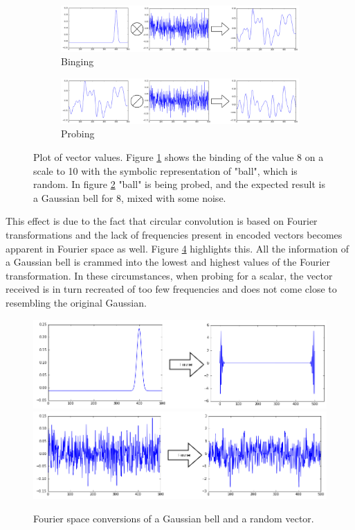 \documentclass[conference]{IEEEtran}
\begin{document}
\begin{figure}
\begin{subfigure}{1\columnwidth}
\includegraphics[width=\columnwidth]{img/scalar-pre-perm.png}
\caption{Binging}
\label{no-perm-a}
\end{subfigure}
\begin{subfigure}{1\columnwidth}
\includegraphics[width=\columnwidth]{img/scalar-pre-perm-probe.png}
\caption{Probing}
\label{no-perm-b}
\end{subfigure}
\caption{Plot of vector values. Figure \ref{no-perm-a} shows the binding of the value 8 on a scale to 10 with the symbolic representation of "ball", which is random. In figure \ref{no-perm-b} "ball" is being probed, and the expected result is a Gaussian bell for 8, mixed with some noise.}
\label{no-perm}
\end{figure}

This effect is due to the fact that circular convolution is based on Fourier transformations and the lack of frequencies present in encoded vectors becomes apparent in Fourier space as well. Figure \ref{fft} highlights this. All the information of a Gaussian bell is crammed into the lowest and highest values of the Fourier transformation. In these circumstances, when probing for a scalar, the vector received is in turn recreated of too few frequencies and does not come close to resembling the original Gaussian. 

\begin{figure}
\includegraphics[width=\columnwidth]{img/scalar-pre-perm-fft.png}
\includegraphics[width=\columnwidth]{img/scalar-random-fft.png}
\caption{Fourier space conversions of a Gaussian bell and a random vector.}
\label{fft}
\end{figure}
\end{document}
